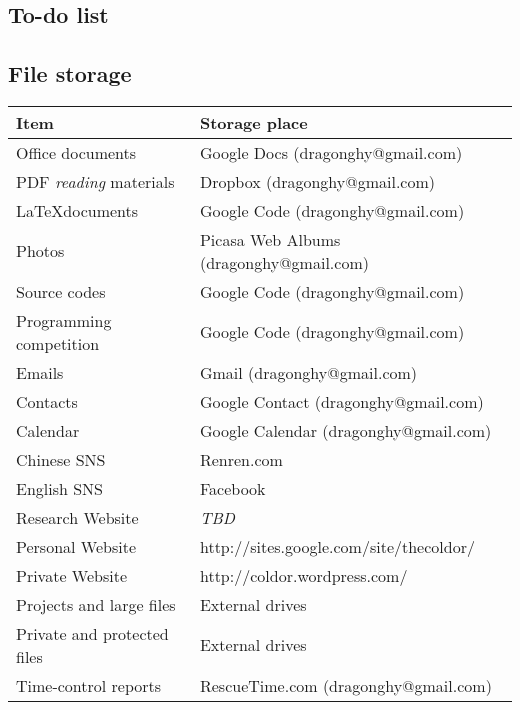 \subsection{To-do list}


\subsection{File storage}

\begin{tabular}{|l|l|}
  \hline
  Item & Storage place \\
  \hline
  Office documents & Google Docs (dragonghy@gmail.com) \\
  PDF \emph{reading} materials & Dropbox (dragonghy@gmail.com) \\
  \LaTeX documents & Google Code (dragonghy@gmail.com) \\
  Photos & Picasa Web Albums (dragonghy@gmail.com) \\
  Source codes & Google Code (dragonghy@gmail.com) \\
  Programming competition & Google Code (dragonghy@gmail.com) \\
  Emails & Gmail (dragonghy@gmail.com) \\
  Contacts & Google Contact (dragonghy@gmail.com) \\
  Calendar & Google Calendar (dragonghy@gmail.com) \\
  Chinese SNS & Renren.com \\
  English SNS & Facebook \\
  Research Website & \emph{TBD} \\
  Personal Website & http://sites.google.com/site/thecoldor/ \\
  Private Website & http://coldor.wordpress.com/ \\
  Projects and large files & External drives \\
  Private and protected files & External drives \\
  Time-control reports & RescueTime.com (dragonghy@gmail.com) \\
  \hline
\end{tabular}
